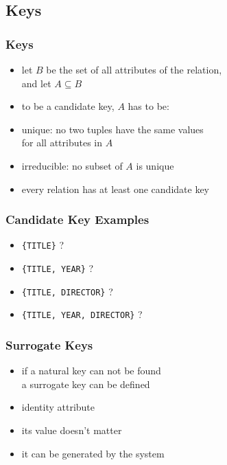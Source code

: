 \documentclass[dvipsnames]{beamer}
\theoremstyle{plain}
\begin{document}
\subsection{Keys}

\begin{frame}
  \frametitle{Keys}

  \begin{itemize}
    \item let $B$ be the set of all attributes of the relation,\\
      and let $A \subseteq B$

    \smallskip
    \item to be a candidate key, $A$ has to be:

    \item \alert{unique}: no two tuples have the same values\\
      for all attributes in $A$
    \item \alert{irreducible}: no subset of $A$ is unique

    \pause
    \bigskip
    \item every relation has at least one candidate key
  \end{itemize}
\end{frame}

\begin{frame}
  \frametitle{Candidate Key Examples}

  \begin{itemize}
    \item \texttt{\{TITLE\}} ?

    \pause
    \item \texttt{\{TITLE, YEAR\}} ?

    \pause
    \item \texttt{\{TITLE, DIRECTOR\}} ?

    \pause
    \item \texttt{\{TITLE, YEAR, DIRECTOR\}} ?
  \end{itemize}
\end{frame}

\begin{frame}
  \frametitle{Surrogate Keys}

  \begin{itemize}
    \item if a \alert{natural key} can not be found\\
      a \alert{surrogate key} can be defined

    \pause
    \medskip
    \item identity attribute
    \item its value doesn't matter
    \item it can be generated by the system
  \end{itemize}
\end{frame}
\end{document}
